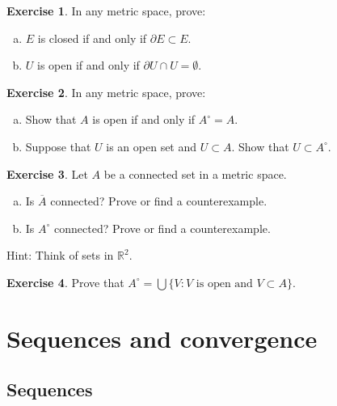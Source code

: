 \documentclass[12pt,openany]{book}
\newcommand{\widebar}[1]{\overline{#1}}
\newcommand{\R}{{\mathbb{R}}}
\theoremstyle{plain}
\theoremstyle{remark}
\theoremstyle{definition}
\newenvironment{exbox}{%
    \def\FrameCommand{\vrule width 1pt \relax\hspace{10pt}}%
    \MakeFramed{\advance\hsize-\width\FrameRestore}%
}{%
    \endMakeFramed
}
\newenvironment{exparts}{%
    \leavevmode\begin{enumerate}[a),noitemsep,topsep=0pt,parsep=0pt,partopsep=0pt]
}{%
    \end{enumerate}
}
\theoremstyle{exercise}
\newtheorem{exercise}{Exercise}[section]
\theoremstyle{example}
\begin{document}
\begin{exbox}
\begin{exercise}
In any metric space, prove:
\begin{exparts}
\item
$E$ is closed if and only if $\partial E \subset E$.
\item
$U$ is open if and only if $\partial U \cap U = \emptyset$.
\end{exparts}
\end{exercise}

\begin{exercise}
In any metric space, prove:
\begin{exparts}
\item
Show that $A$ is open if and only if $A^\circ = A$.
\item
Suppose that $U$ is an open set and $U \subset A$.  Show
that $U \subset A^\circ$.
\end{exparts}
\end{exercise}

\begin{exercise}
Let $A$ be a connected set in a metric space.
\begin{exparts}
\item
Is $\widebar{A}$ connected?  Prove or find a counterexample.
\item
Is $A^\circ$ connected?  Prove or find a counterexample.
\end{exparts}
Hint: Think of sets in $\R^2$.
\end{exercise}

\begin{exercise}
Prove that
$A^\circ = \bigcup \{ V : V \text{ is open and } V \subset A \}$.
\end{exercise}
\end{exbox}


\section{Sequences and convergence}
\label{sec:metseqs}

\subsection{Sequences}
\end{document}
